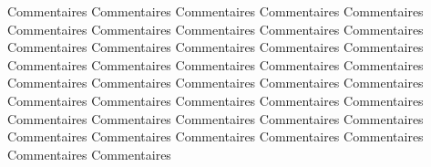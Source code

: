 	Commentaires Commentaires Commentaires Commentaires Commentaires Commentaires Commentaires Commentaires Commentaires Commentaires Commentaires Commentaires Commentaires Commentaires Commentaires Commentaires Commentaires Commentaires Commentaires Commentaires Commentaires Commentaires Commentaires Commentaires Commentaires Commentaires Commentaires Commentaires Commentaires Commentaires Commentaires Commentaires Commentaires Commentaires Commentaires Commentaires Commentaires Commentaires Commentaires Commentaires Commentaires Commentaires 